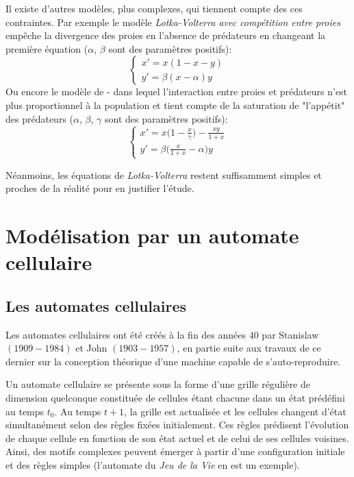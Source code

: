 \documentclass[11pt]{article}
\begin{document}
Il existe d'autres modèles, plus complexes, qui tiennent compte des ces contraintes. Par exemple le modèle \emph{Lotka-Volterra avec compétition entre proies} empêche la divergence des proies en l'absence de prédateurs en changeant la première équation ($\alpha$, $\beta$ sont des paramètres positifs):
\[\begin{cases}
x' =x(1-x-y)\\
y' =\beta(x-\alpha)y
\end{cases} \]
\noindent Ou encore le modèle de - dans lequel l'interaction entre proies et prédateurs n'est plus proportionnel à la population et tient compte de la saturation de "l'appétit" des prédateurs ($\alpha$, $\beta$, $\gamma$ sont des paramètres positifs):
\[\begin{cases}
x' = x\big(1-\frac{x}{\gamma}\big)-\frac{xy}{1+x}\\
y' = \beta\big(\frac{x}{1+x}-\alpha\big)y
\end{cases} \]

Néanmoins, les équations de \emph{Lotka-Volterra} restent suffisamment simples et proches de la réalité pour en justifier l'étude.


\section{Modélisation par un automate cellulaire}


\subsection{Les automates cellulaires}

Les automates cellulaires ont été créés à la fin des années $40$ par Stanislaw  $(1909 - 1984)$ et John  $(1903-1957)$, en partie suite aux travaux de ce dernier sur la conception théorique d'une machine capable de s'auto-reproduire.

Un automate cellulaire se présente sous la forme d'une grille régulière de dimension quelconque constituée de cellules étant chacune dans un état prédéfini au temps $t_0$. Au temps $t+1$, la grille est actualisée et les cellules changent d'état simultanément selon des règles fixées initialement. Ces règles prédisent l'évolution de chaque cellule en fonction de son état actuel et de celui de ses cellules voisines. Ainsi, des motifs complexes peuvent émerger à partir d'une configuration initiale et des règles simples (l'automate du \emph{Jeu de la Vie} en est un exemple).
\end{document}
